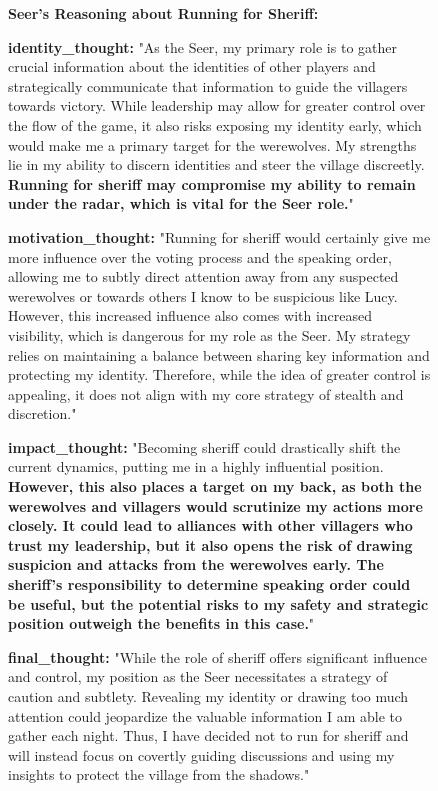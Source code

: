 \begin{figure}[htbp]
\centering
\begin{tcolorbox}[colback=blue!2!white, colframe=gray!50!blue]
\begin{minipage}{\linewidth}
\small
\textbf{Seer’s Reasoning about Running for Sheriff:}

\textbf{identity\_thought:}  
"As the Seer, my primary role is to gather crucial information about the identities of other players and strategically communicate that information to guide the villagers towards victory. While leadership may allow for greater control over the flow of the game, it also risks exposing my identity early, which would make me a primary target for the werewolves. My strengths lie in my ability to discern identities and steer the village discreetly. \textbf{Running for sheriff may compromise my ability to remain under the radar, which is vital for the Seer role.}"

\textbf{motivation\_thought:}  
"Running for sheriff would certainly give me more influence over the voting process and the speaking order, allowing me to subtly direct attention away from any suspected werewolves or towards others I know to be suspicious like Lucy. However, this increased influence also comes with increased visibility, which is dangerous for my role as the Seer. My strategy relies on maintaining a balance between sharing key information and protecting my identity. Therefore, while the idea of greater control is appealing, it does not align with my core strategy of stealth and discretion."

\textbf{impact\_thought:}  
"Becoming sheriff could drastically shift the current dynamics, putting me in a highly influential position. \textbf{However, this also places a target on my back, as both the werewolves and villagers would scrutinize my actions more closely. It could lead to alliances with other villagers who trust my leadership, but it also opens the risk of drawing suspicion and attacks from the werewolves early. The sheriff's responsibility to determine speaking order could be useful, but the potential risks to my safety and strategic position outweigh the benefits in this case.}"

\textbf{final\_thought:}  
"While the role of sheriff offers significant influence and control, my position as the Seer necessitates a strategy of caution and subtlety. Revealing my identity or drawing too much attention could jeopardize the valuable information I am able to gather each night. Thus, I have decided not to run for sheriff and will instead focus on covertly guiding discussions and using my insights to protect the village from the shadows."


\end{minipage}
\end{tcolorbox}
\end{figure}
